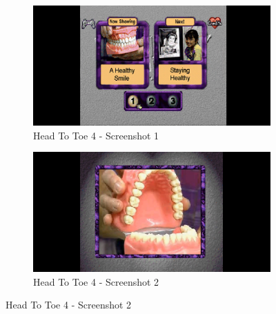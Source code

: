 \begin{figure}[H]
    \centering
    \begin{subfigure}{0.45\textwidth}
        \centering
        \includegraphics[width=\linewidth]{Games/HeadtoToe/Images/HeadToToe4Image1.png}
        \caption{Head To Toe 4 - Screenshot 1}
    \end{subfigure}
    \begin{subfigure}{0.45\textwidth}
        \includegraphics[width=\linewidth]{Games/HeadtoToe/Images/HeadToToe4Image2.png}
        \caption{Head To Toe 4 - Screenshot 2}
    \end{subfigure}


\end{figure}
